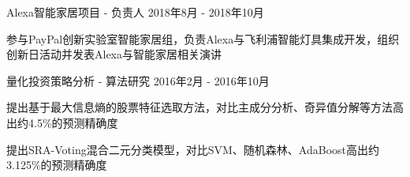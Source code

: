 \documentclass[11pt, a4paper, UTF8]{awesome-cv}
\begin{document}
\begin{cventries}
\end{cventries}



%
\begin{cventries}
  \cventry
    {Alexa智能家居项目 - 负责人} %
    {} %
    {} %
    {2018年8月 - 2018年10月} %
    {
      \begin{cvitems} %
        \item {参与PayPal创新实验室智能家居组，负责Alexa与飞利浦智能灯具集成开发，组织创新日活动并发表Alexa与智能家居相关演讲}
      \end{cvitems}
    }

  \cventry
    {量化投资策略分析 - 算法研究} %
    {} %
    {} %
    {2016年2月 - 2016年10月} %
    {
      \begin{cvitems} %
        \item {提出基于最大信息熵的股票特征选取方法，对比主成分分析、奇异值分解等方法高出约4.5\%的预测精确度}
        \item {提出SRA-Voting混合二元分类模型，对比SVM、随机森林、AdaBoost高出约3.125\%的预测精确度}
      \end{cvitems}
    }
    
    
\end{cventries}
\end{document}
